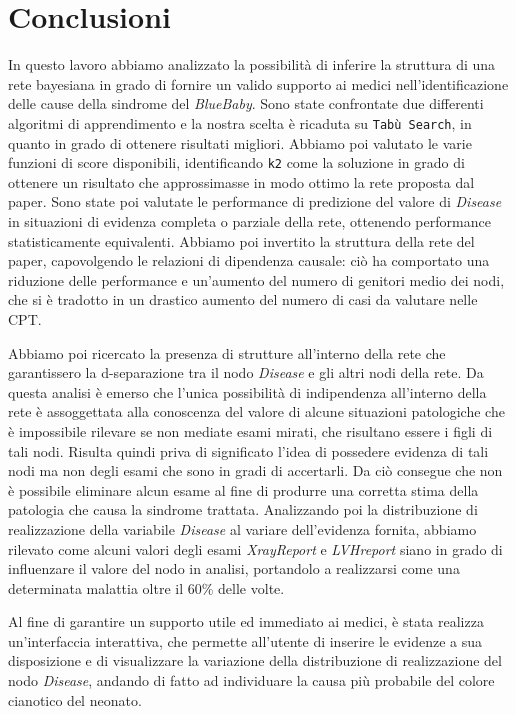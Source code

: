 \chapter{Conclusioni}
In questo lavoro abbiamo analizzato la possibilità di inferire la struttura di una rete bayesiana in grado di fornire un valido supporto ai medici nell'identificazione delle cause della sindrome del \textit{BlueBaby}. Sono state confrontate due differenti algoritmi di apprendimento e la nostra scelta è ricaduta su \texttt{Tabù Search}, in quanto in grado di ottenere risultati migliori. Abbiamo poi valutato le varie funzioni di score disponibili, identificando \texttt{k2} come la soluzione in grado di ottenere un risultato che approssimasse in modo ottimo la rete proposta dal paper.
Sono state poi valutate le performance di predizione del valore di \textit{Disease} in situazioni di evidenza completa o parziale della rete, ottenendo performance statisticamente equivalenti. Abbiamo poi invertito la struttura della rete del paper, capovolgendo le relazioni di dipendenza causale: ciò ha comportato una riduzione delle performance e un'aumento del numero di genitori medio dei nodi, che si è tradotto in un drastico aumento del numero di casi da valutare nelle CPT.

Abbiamo poi ricercato la presenza di strutture all'interno della rete che garantissero la d-separazione tra il nodo \textit{Disease} e gli altri nodi della rete. Da questa analisi è emerso che l'unica possibilità di indipendenza all'interno della rete è assoggettata alla conoscenza del valore di alcune situazioni patologiche che è impossibile rilevare se non mediate esami mirati, che risultano essere i figli di tali nodi. Risulta quindi priva di significato l'idea di possedere evidenza di tali nodi ma non degli esami che sono in gradi di accertarli. Da ciò consegue che non è possibile eliminare alcun esame al fine di produrre una corretta stima della patologia che causa la sindrome trattata.
Analizzando poi la distribuzione di realizzazione della variabile \textit{Disease} al variare dell'evidenza fornita, abbiamo rilevato come alcuni valori degli esami \textit{XrayReport} e \textit{LVHreport} siano in grado di influenzare il valore del nodo in analisi, portandolo a realizzarsi come una determinata malattia oltre il $60\%$ delle volte.

Al fine di garantire un supporto utile ed immediato ai medici, è stata realizza un'interfaccia interattiva, che permette all'utente di inserire le evidenze a sua disposizione e di visualizzare la variazione della distribuzione di realizzazione del nodo \textit{Disease}, andando di fatto ad individuare la causa più probabile del colore cianotico del neonato.
